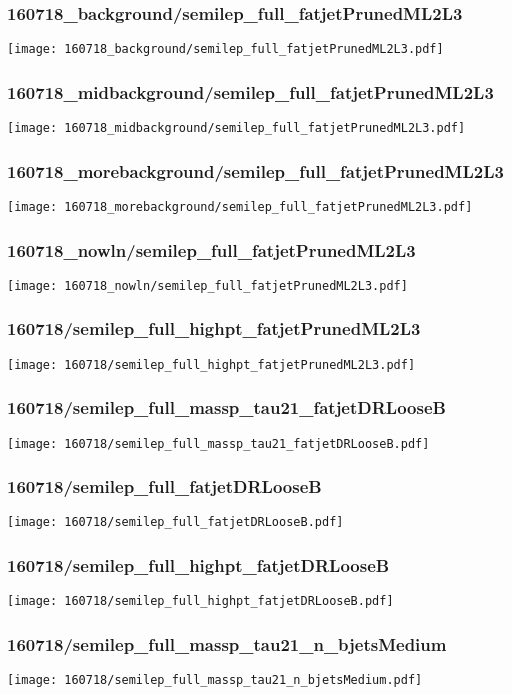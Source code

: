 \begin{frame}
   \frametitle{\small 160718\_background/semilep\_full\_fatjetPrunedML2L3}
   \centering
   \texttt{[image: 160718\_background/semilep\_full\_fatjetPrunedML2L3.pdf]}
\end{frame}

\begin{frame}
   \frametitle{\small 160718\_midbackground/semilep\_full\_fatjetPrunedML2L3}
   \centering
   \texttt{[image: 160718\_midbackground/semilep\_full\_fatjetPrunedML2L3.pdf]}
\end{frame}

\begin{frame}
   \frametitle{\small 160718\_morebackground/semilep\_full\_fatjetPrunedML2L3}
   \centering
   \texttt{[image: 160718\_morebackground/semilep\_full\_fatjetPrunedML2L3.pdf]}
\end{frame}

\begin{frame}
   \frametitle{\small 160718\_nowln/semilep\_full\_fatjetPrunedML2L3}
   \centering
   \texttt{[image: 160718\_nowln/semilep\_full\_fatjetPrunedML2L3.pdf]}
\end{frame}

\begin{frame}
   \frametitle{\small 160718/semilep\_full\_highpt\_fatjetPrunedML2L3}
   \centering
   \texttt{[image: 160718/semilep\_full\_highpt\_fatjetPrunedML2L3.pdf]}
\end{frame}

\begin{frame}
   \frametitle{\small 160718/semilep\_full\_massp\_tau21\_fatjetDRLooseB}
   \centering
   \texttt{[image: 160718/semilep\_full\_massp\_tau21\_fatjetDRLooseB.pdf]}
\end{frame}

\begin{frame}
   \frametitle{\small 160718/semilep\_full\_fatjetDRLooseB}
   \centering
   \texttt{[image: 160718/semilep\_full\_fatjetDRLooseB.pdf]}
\end{frame}

\begin{frame}
   \frametitle{\small 160718/semilep\_full\_highpt\_fatjetDRLooseB}
   \centering
   \texttt{[image: 160718/semilep\_full\_highpt\_fatjetDRLooseB.pdf]}
\end{frame}

\begin{frame}
   \frametitle{\small 160718/semilep\_full\_massp\_tau21\_n\_bjetsMedium}
   \centering
   \texttt{[image: 160718/semilep\_full\_massp\_tau21\_n\_bjetsMedium.pdf]}
\end{frame}

